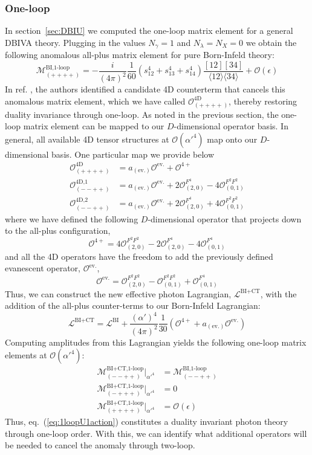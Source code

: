 \documentclass[12pt,letter]{article}
\def\sect#1{section~\ref{#1}}
\def\eqn#1{eq.~(\ref{#1})}
\def\be{\begin{equation}}
\def\ee{\end{equation}}
\begin{document}
\subsubsection{One-loop}\label{sec:Anomalies1loop}
In \sect{sec:DBIU} we computed the one-loop matrix element for a general DBIVA theory. Plugging in the values $N_{\gamma}=1$ and $N_\lambda = N_X = 0$ we obtain the following anomalous all-plus matrix element for pure Born-Infeld theory:
\be
\mathcal{M}^{\text{BI,1-loop}}_{(++++)} = -\frac{i}{(4\pi)^2}\frac{1}{60}(s_{12}^4+s_{13}^4+s_{14}^4)\frac{[12][34]}{\langle12\rangle\langle 34\rangle}+\mathcal{O}(\epsilon)
\ee
In ref. \cite{Elvang:2020kuj}, the authors identified a candidate 4D counterterm that cancels this anomalous matrix element, which we have called $\mathcal{O}^{\text{4D}}_{(++++)}$, thereby restoring duality invariance through one-loop. As noted in the previous section, the one-loop matrix element can be mapped to our $D$-dimensional operator basis. In general, all available 4D tensor structures at $\mathcal{O}(\alpha'^4)$ map onto our $D$-dimensional basis. One particular map we provide below
\begin{align}
\mathcal{O}^{\text{4D}}_{(++++)} &=  a_{({\text{ev.}})}\mathcal{O}^{\text{ev.}}+\mathcal{O}^{4+}
\\ 
\mathcal{O}^{\text{4D,1}}_{(--++)} &= a_{({\text{ev.}})}\mathcal{O}^{\text{ev.}}+2\mathcal{O}_{(2,0)}^{F^4}- 4\mathcal{O}_{(0,1)}^{F^2F^2}
\\ 
\mathcal{O}^{4\text{D,}2}_{(--++)} &= a_{({\text{ev.}})}\mathcal{O}^{\text{ev.}}+2\mathcal{O}_{(2,0)}^{F^4}+ 4\mathcal{O}_{(0,1)}^{F^2F^2}
\end{align}
where we have defined the following $D$-dimensional operator that projects down to the all-plus configuration,
\be
\mathcal{O}^{4+}= 4 \mathcal{O}_{(2,0)}^{F^2F^2}-2\mathcal{O}_{(2,0)}^{F^4}-4\mathcal{O}_{(0,1)}^{F^4}
\ee
and all the 4D operators have the freedom to add the previously defined evanescent operator, $\mathcal{O}^{\text{ev.}}$, 
\be
\mathcal{O}^{\text{ev.}} = \mathcal{O}_{(2,0)}^{F^2F^2}-\mathcal{O}_{(0,1)}^{F^2F^2} + \mathcal{O}_{(0,1)}^{F^4}
\ee
Thus, we can construct the new effective photon Lagrangian, $\mathcal{L}^{\text{BI}+\text{CT}}$, with the addition of the all-plus counter-terms to our Born-Infeld Lagrangian:
\be \label{eq:1loopU1action}
\mathcal{L}^{\text{BI}+\text{CT}} = \mathcal{L}^{\text{BI}} + \frac{(\alpha')^4}{(4\pi)^2}\frac{1}{30}\left(\mathcal{O}^{4+}+ a_{({\text{ev.}})}\mathcal{O}^{\text{ev.}}\right)
\ee
Computing amplitudes from this Lagrangian yields the following one-loop matrix elements at $\mathcal{O}(\alpha'^4)$:
\begin{align}
\mathcal{M}^{\text{BI+CT,1-loop}}_{(--++)}\big|_{\alpha'^4} &= \mathcal{M}^{\text{BI,1-loop}}_{(--++)}  
\\
 \mathcal{M}^{\text{BI+CT,1-loop}}_{(-+++)}\big|_{\alpha'^4} &= 0
 \\
 \mathcal{M}^{\text{BI+CT,1-loop}}_{(++++)}\big|_{\alpha'^4}  &= \mathcal{O}(\epsilon)
\end{align}
Thus, \eqn{eq:1loopU1action} constitutes a duality invariant photon theory through one-loop order. With this, we can identify what additional operators will be needed to cancel the anomaly through two-loop. 
\end{document}
